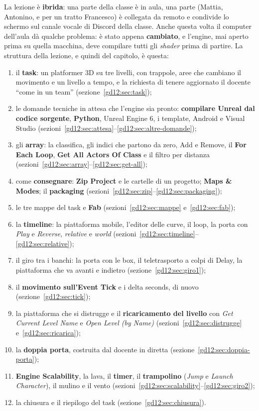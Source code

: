 La lezione è \textbf{ibrida}: una parte della classe è in aula, una parte
(Mattia, Antonino, e per un tratto Francesco) è collegata da remoto e condivide
lo schermo sul canale vocale di Discord della classe. Anche questa volta il
computer dell'aula dà qualche problema: è stato appena \textbf{cambiato}, e
l'engine, mai aperto prima su quella macchina, deve compilare tutti gli
\emph{shader} prima di partire. La struttura della lezione, e quindi del
capitolo, è questa:
\begin{enumerate}
  \item il \textbf{task}: un platformer 3D su tre livelli, con trappole, aree
        che cambiano il movimento e un livello a tempo, e la richiesta di
        tenere aggiornato il docente ``come in un team''
        (sezione~\ref{gd12:sec:task});
  \item le domande tecniche in attesa che l'engine sia pronto:
        \textbf{compilare Unreal dal codice sorgente}, \textbf{Python},
        Unreal Engine 6, i template, Android e Visual Studio
        (sezioni~\ref{gd12:sec:attesa}--\ref{gd12:sec:altre-domande});
  \item gli \textbf{array}: la classifica, gli indici che partono da zero,
        Add e Remove, il \textbf{For Each Loop}, \textbf{Get All Actors Of
        Class} e il filtro per distanza
        (sezioni~\ref{gd12:sec:array}--\ref{gd12:sec:get-all});
  \item come \textbf{consegnare}: \textbf{Zip Project} e le cartelle di un
        progetto; \textbf{Maps \& Modes}; il \textbf{packaging}
        (sezioni~\ref{gd12:sec:zip}--\ref{gd12:sec:packaging});
  \item le tre mappe del task e \textbf{Fab}
        (sezioni~\ref{gd12:sec:mappe} e~\ref{gd12:sec:fab});
  \item la \textbf{timeline}: la piattaforma mobile, l'editor delle curve, il
        loop, la porta con \emph{Play} e \emph{Reverse}, \emph{relative} e
        \emph{world} (sezioni~\ref{gd12:sec:timeline}--\ref{gd12:sec:relative});
  \item il giro tra i banchi: la porta con le box, il teletrasporto a colpi di
        Delay, la piattaforma che va avanti e indietro
        (sezione~\ref{gd12:sec:giro1});
  \item il \textbf{movimento sull'Event Tick} e i delta seconds, di nuovo
        (sezione~\ref{gd12:sec:tick});
  \item la piattaforma che si distrugge e il \textbf{ricaricamento del
        livello} con \emph{Get Current Level Name} e \emph{Open Level (by
        Name)} (sezioni~\ref{gd12:sec:distrugge} e~\ref{gd12:sec:ricarica});
  \item la \textbf{doppia porta}, costruita dal docente in diretta
        (sezione~\ref{gd12:sec:doppia-porta});
  \item \textbf{Engine Scalability}, la lava, il \textbf{timer}, il
        \textbf{trampolino} (\emph{Jump} e \emph{Launch Character}), il mulino
        e il vento (sezioni~\ref{gd12:sec:scalability}--\ref{gd12:sec:giro2});
  \item la chiusura e il riepilogo del task (sezione~\ref{gd12:sec:chiusura}).
\end{enumerate}

